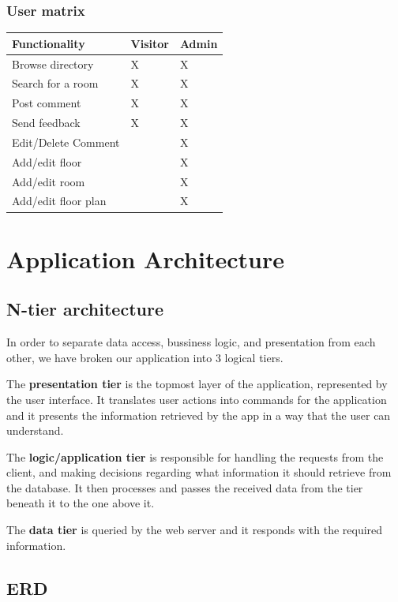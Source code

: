 \documentclass{sig-alt-release2}
\begin{document}
\subsubsection*{User matrix}
\begin{tabular}{| p{4cm} | p{1cm} | p{1cm}|} \hline
\textbf{Functionality} & \textbf{Visitor} & \textbf{Admin} \\ \hline
Browse directory & X & X \\ \hline
Search for a room & X & X \\ \hline
Post comment & X & X \\ \hline
Send feedback & X & X \\ \hline
Edit/Delete Comment & & X \\ \hline
Add/edit floor &  & X \\ \hline
Add/edit room & & X \\ \hline
Add/edit floor plan & & X \\ \hline

\end{tabular}	


\section{Application Architecture}

\subsection*{N-tier architecture}
In order to separate data access, bussiness logic, and presentation from each
other, we have broken our application into 3 logical tiers.

The \textbf{presentation tier} is the topmost layer of the application,
represented by the user interface. It translates user actions into commands
for the application and it presents the information retrieved by the app in a
way that the user can understand.

The \textbf{logic/application tier} is responsible for handling the requests
from the client, and making decisions regarding what information it should
retrieve from the database. It then processes and passes the received data
from the tier beneath it to the one above it.

The \textbf{data tier} is queried by the web server and it responds with the required information.

\subsection*{ERD}
\end{document}
